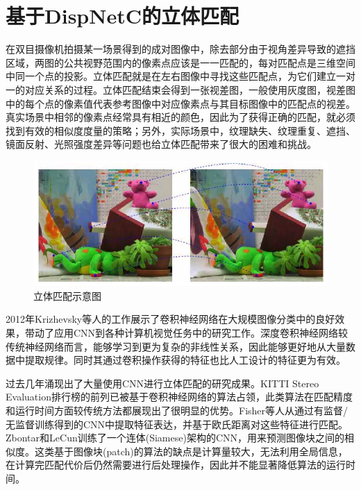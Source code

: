 
\chapter{基于DispNetC的立体匹配}

在双目摄像机拍摄某一场景得到的成对图像中，除去部分由于视角差异导致的遮挡区域，两图的公共视野范围内的像素点应该是一一匹配的，每对匹配点是三维空间中同一个点的投影。立体匹配就是在左右图像中寻找这些匹配点，为它们建立一对一的对应关系的过程。立体匹配结束会得到一张视差图，一般使用灰度图，视差图中的每个点的像素值代表参考图像中对应像素点与其目标图像中的匹配点的视差。真实场景中相邻的像素点经常具有相近的颜色，因此为了获得正确的匹配，就必须找到有效的相似度度量的策略；另外，实际场景中，纹理缺失、纹理重复、遮挡、镜面反射、光照强度差异等问题也给立体匹配带来了很大的困难和挑战。

\begin{figure}[!htb]
	\centering\includegraphics[width=5in]{figures/4_0_stereo_correspondence}
	\caption{立体匹配示意图}\label{fig:4_0_stereo_correspondence}
\end{figure}

2012年Krizhevsky等人的工作\cite{krizhevsky2012imagenet}展示了卷积神经网络在大规模图像分类中的良好效果，带动了应用CNN到各种计算机视觉任务中的研究工作。深度卷积神经网络较传统神经网络而言，能够学习到更为复杂的非线性关系，因此能够更好地从大量数据中提取规律。同时其通过卷积操作获得的特征也比人工设计的特征更为有效。

过去几年涌现出了大量使用CNN进行立体匹配的研究成果。KITTI\cite{Menze_2015_CVPR} Stereo Evaluation排行榜的前列已被基于卷积神经网络的算法占领，此类算法在匹配精度和运行时间方面较传统方法都展现出了很明显的优势。Fisher等人\cite{fischer2014descriptor}从通过有监督/无监督训练得到的CNN中提取特征表达，并基于欧氏距离对这些特征进行匹配。Zbontar和LeCun\cite{zbontar2016stereo}训练了一个连体(Siamese)架构的CNN，用来预测图像块之间的相似度。这类基于图像块(patch)的算法的缺点是计算量较大，无法利用全局信息，在计算完匹配代价后仍然需要进行后处理操作，因此并不能显著降低算法的运行时间。

